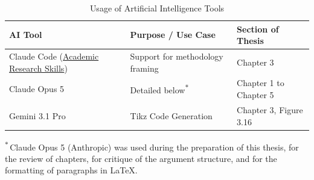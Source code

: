 \documentclass[12pt, a4paper]{report} %
\begin{document}
\begin{table}[htbp]
    \centering
    \begin{tabular}{p{4.6cm}ll}
        \toprule
        AI Tool                                                                                              & Purpose / Use Case                     & Section of Thesis      \\
        \midrule
        Claude Code (\href{https://github.com/Imbad0202/academic-research-skills}{Academic Research Skills}) & Support for methodology framing        & Chapter 3              \\
        Claude Opus 5                                                                                        & Detailed below\textsuperscript{$\ast$} & Chapter 1 to Chapter 5 \\
        Gemini 3.1 Pro                                                                                       & Tikz Code Generation                   & Chapter 3, Figure 3.16 \\
        \bottomrule
    \end{tabular}
    \caption{Usage of Artificial Intelligence Tools}
    \label{tab:aiuse}
\end{table}

\noindent\textsuperscript{$\ast$}\,Claude Opus 5 (Anthropic) was used during the preparation of this thesis, for the review of chapters, for critique of the argument structure, and for the formatting of paragraphs in \LaTeX.

\tableofcontents
{}
\newpage

\listoffigures
{}
\newpage

\listoftables
{}
\newpage
\end{document}
